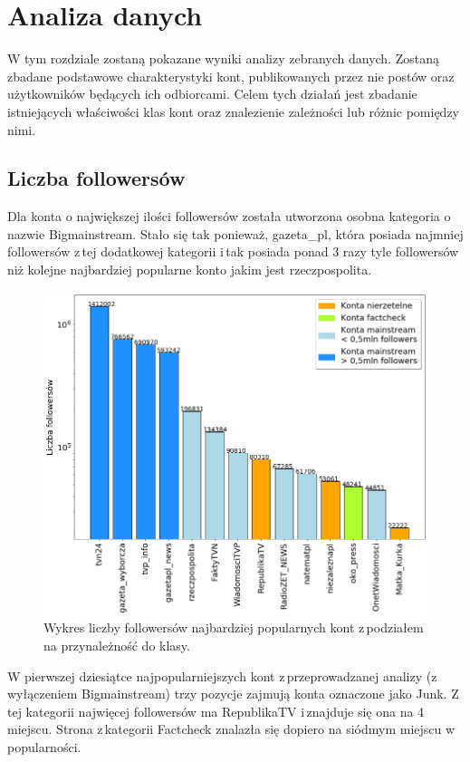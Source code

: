 \newpage
\section{Analiza danych}
W tym rozdziale zostaną pokazane wyniki analizy zebranych danych. Zostaną zbadane podstawowe charakterystyki kont, publikowanych przez nie postów oraz użytkowników będących ich odbiorcami.  Celem tych działań jest zbadanie istniejących właściwości klas kont oraz znalezienie zależności lub różnic pomiędzy nimi.  
\subsection{Liczba followersów }Dla konta o największej ilości followersów została utworzona osobna kategoria o\,nazwie Bigmainstream. Stało się tak ponieważ, gazeta\_pl, która posiada najmniej followersów z\,tej dodatkowej kategorii i\,tak posiada ponad 3 razy tyle followersów niż kolejne najbardziej popularne konto jakim jest rzeczpospolita.
\begin{figure}[!h]
	\label{fig:followers}
	\centering \includegraphics[width=0.9\linewidth]{img/results/followers.png}
	\caption{Wykres liczby followersów najbardziej popularnych kont z\,podziałem na przynależność do klasy.}
\end{figure}
\par
W pierwszej dziesiątce najpopularniejszych kont z\,przeprowadzanej analizy (z wyłączeniem Bigmainstream) trzy pozycje zajmują konta oznaczone jako Junk. Z\,tej kategorii najwięcej followersów ma RepublikaTV i\,znajduje się ona na 4 miejscu. Strona z\,kategorii Factcheck znalazła się dopiero na siódmym miejscu w\,popularności.


